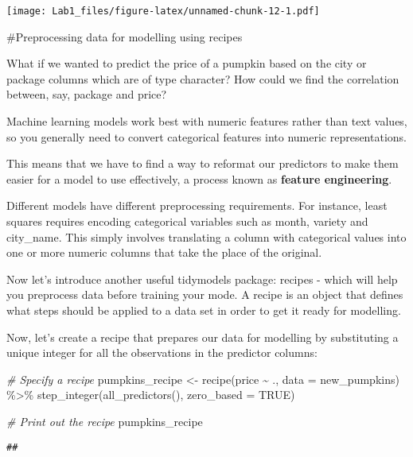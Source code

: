 \documentclass[
]{article}
\newenvironment{Shaded}{\begin{snugshade}}{\end{snugshade}}
\newcommand{\AttributeTok}[1]{\textcolor[rgb]{0.77,0.63,0.00}{#1}}
\newcommand{\CommentTok}[1]{\textcolor[rgb]{0.56,0.35,0.01}{\textit{#1}}}
\newcommand{\ConstantTok}[1]{\textcolor[rgb]{0.00,0.00,0.00}{#1}}
\newcommand{\FunctionTok}[1]{\textcolor[rgb]{0.00,0.00,0.00}{#1}}
\newcommand{\NormalTok}[1]{#1}
\newcommand{\OtherTok}[1]{\textcolor[rgb]{0.56,0.35,0.01}{#1}}
\newcommand{\SpecialCharTok}[1]{\textcolor[rgb]{0.00,0.00,0.00}{#1}}
\begin{document}
\texttt{[image: Lab1\_files/figure-latex/unnamed-chunk-12-1.pdf]}

\#Preprocessing data for modelling using recipes

What if we wanted to predict the price of a pumpkin based on the city or
package columns which are of type character? How could we find the
correlation between, say, package and price?

Machine learning models work best with numeric features rather than text
values, so you generally need to convert categorical features into
numeric representations.

This means that we have to find a way to reformat our predictors to make
them easier for a model to use effectively, a process known as
\textbf{feature engineering}.

Different models have different preprocessing requirements. For
instance, least squares requires encoding categorical variables such as
month, variety and city\_name. This simply involves translating a column
with categorical values into one or more numeric columns that take the
place of the original.

Now let's introduce another useful tidymodels package: recipes - which
will help you preprocess data before training your mode. A recipe is an
object that defines what steps should be applied to a data set in order
to get it ready for modelling.

Now, let's create a recipe that prepares our data for modelling by
substituting a unique integer for all the observations in the predictor
columns:

\begin{Shaded}
\begin{Highlighting}[]
\CommentTok{\# Specify a recipe}
\NormalTok{pumpkins\_recipe }\OtherTok{\textless{}{-}} \FunctionTok{recipe}\NormalTok{(price }\SpecialCharTok{\textasciitilde{}}\NormalTok{ ., }\AttributeTok{data =}\NormalTok{ new\_pumpkins) }\SpecialCharTok{\%\textgreater{}\%} 
  \FunctionTok{step\_integer}\NormalTok{(}\FunctionTok{all\_predictors}\NormalTok{(), }\AttributeTok{zero\_based =} \ConstantTok{TRUE}\NormalTok{)}


\CommentTok{\# Print out the recipe}
\NormalTok{pumpkins\_recipe}
\end{Highlighting}
\end{Shaded}

\begin{verbatim}
## 
\end{verbatim}
\end{document}
